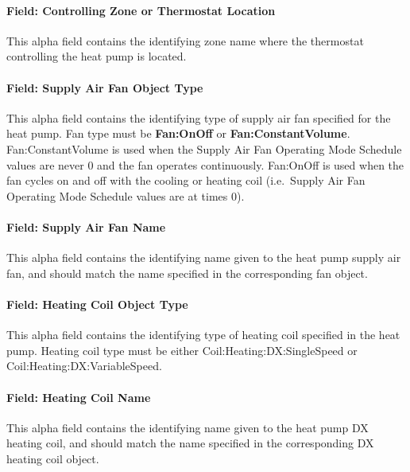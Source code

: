 \paragraph{Field: Controlling Zone or Thermostat Location}\label{field-controlling-zone-or-thermostat-location-3}

This alpha field contains the identifying zone name where the thermostat controlling the heat pump is located.

\paragraph{Field: Supply Air Fan Object Type}\label{field-supply-air-fan-object-type}

This alpha field contains the identifying type of supply air fan specified for the heat pump. Fan type must be \textbf{Fan:OnOff} or \textbf{Fan:ConstantVolume}. Fan:ConstantVolume is used when the Supply Air Fan Operating Mode Schedule values are never 0 and the fan operates continuously. Fan:OnOff is used when the fan cycles on and off with the cooling or heating coil (i.e.~Supply Air Fan Operating Mode Schedule values are at times 0).

\paragraph{Field: Supply Air Fan Name}\label{field-supply-air-fan-name}

This alpha field contains the identifying name given to the heat pump supply air fan, and should match the name specified in the corresponding fan object.

\paragraph{Field: Heating Coil Object Type}\label{field-heating-coil-object-type-3}

This alpha field contains the identifying type of heating coil specified in the heat pump. Heating coil type must be either Coil:Heating:DX:SingleSpeed or Coil:Heating:DX:VariableSpeed.

\paragraph{Field: Heating Coil Name}\label{field-heating-coil-name-3}

This alpha field contains the identifying name given to the heat pump DX heating coil, and should match the name specified in the corresponding DX heating coil object.


